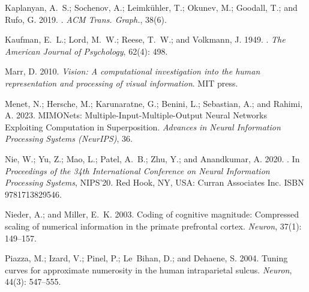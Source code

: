 \documentclass[letterpaper]{article} %
\begin{document}
\begin{thebibliography}{33}
    Kaplanyan, A.~S.; Sochenov, A.; Leimk{\"{u}}hler, T.; Okunev, M.; Goodall, T.;
      and Rufo, G. 2019.
    .
    \newblock \emph{ACM Trans. Graph.}, 38(6).
    
    Kaufman, E.~L.; Lord, M.~W.; Reese, T.~W.; and Volkmann, J. 1949.
    .
    \newblock \emph{The American Journal of Psychology}, 62(4): 498.
    
    Marr, D. 2010.
    \newblock \emph{Vision: A computational investigation into the human
      representation and processing of visual information}.
    \newblock MIT press.
    
    Menet, N.; Hersche, M.; Karunaratne, G.; Benini, L.; Sebastian, A.; and Rahimi,
      A. 2023.
    \newblock MIMONets: Multiple-Input-Multiple-Output Neural Networks Exploiting
      Computation in Superposition.
    \newblock \emph{Advances in Neural Information Processing Systems (NeurIPS)},
      36.
    
    Nie, W.; Yu, Z.; Mao, L.; Patel, A.~B.; Zhu, Y.; and Anandkumar, A. 2020.
    .
    \newblock In \emph{Proceedings of the 34th International Conference on Neural
      Information Processing Systems}, NIPS'20. Red Hook, NY, USA: Curran
      Associates Inc.
    \newblock ISBN 9781713829546.
    
    Nieder, A.; and Miller, E.~K. 2003.
    \newblock Coding of cognitive magnitude: Compressed scaling of numerical
      information in the primate prefrontal cortex.
    \newblock \emph{Neuron}, 37(1): 149--157.
    
    Piazza, M.; Izard, V.; Pinel, P.; Le~Bihan, D.; and Dehaene, S. 2004.
    \newblock Tuning curves for approximate numerosity in the human intraparietal
      sulcus.
    \newblock \emph{Neuron}, 44(3): 547--555.
    

\end{thebibliography}
\end{document}
